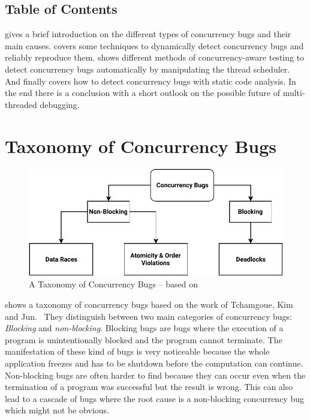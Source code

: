 \documentclass[conference]{IEEEtran}
\begin{document}
\subsection{Table of Contents}

 gives a brief introduction on the different types of concurrency bugs and their main causes.
 covers some techniques to dynamically detect concurrency bugs and reliably reproduce them.
 shows different methods of concurrency-aware testing to detect concurrency bugs automatically by manipulating the thread scheduler.
And  finally covers how to detect concurrency bugs with static code analysis.
In the end there is a conclusion with a short outlook on the possible future of multi-threaded debugging.


\section{Taxonomy of Concurrency Bugs}
\label{sct:taxonomy}

\begin{figure}
    \includegraphics[width=\linewidth]{figures/ConcurrencyBugClasses.pdf}
    \caption{A Taxonomy of Concurrency Bugs -- based on\cite{tchamgoue2012testing}}
    \label{fig:classes}
\end{figure}

 shows a taxonomy of concurrency bugs based on the work of Tchamgoue, Kim and Jun.~\cite{tchamgoue2012testing}
They distinguish between two main categories of concurrency bugs: \emph{Blocking} and \emph{non-blocking}.
Blocking bugs are bugs where the execution of a program is unintentionally blocked and the program cannot terminate.
The manifestation of these kind of bugs is very noticeable because the whole application freezes and has to be shutdown before the computation can continue.
Non-blocking bugs are often harder to find because they can occur even when the termination of a program was successful but the result is wrong.
This can also lead to a cascade of bugs where the root cause is a non-blocking concurrency bug which might not be obvious.
\end{document}

